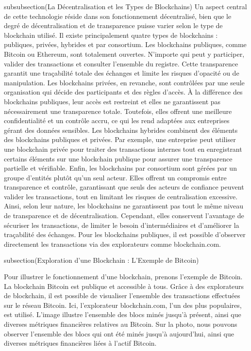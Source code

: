 subsubsection(La Décentralisation et les Types de Blockchains)
Un aspect central de cette technologie réside dans son fonctionnement décentralisé, bien que le degré de décentralisation et de transparence puisse varier selon le type de blockchain utilisé. Il existe principalement quatre types de blockchains : publiques, privées, hybrides et par consortium.
Les blockchains publiques, comme Bitcoin ou Ethereum, sont totalement ouvertes. N’importe qui peut y participer, valider des transactions et consulter l’ensemble du registre. Cette transparence garantit une traçabilité totale des échanges et limite les risques d’opacité ou de manipulation.
Les blockchains privées, en revanche, sont contrôlées par une seule organisation qui décide des participants et des règles d’accès. À la différence des blockchains publiques, leur accès est restreint et elles ne garantissent pas nécessairement une transparence totale. Toutefois, elles offrent une meilleure confidentialité et un contrôle accru, ce qui les rend adaptées aux entreprises gérant des données sensibles.
Les blockchains hybrides combinent des éléments des blockchains publiques et privées. Par exemple, une entreprise peut utiliser une blockchain privée pour traiter des transactions internes tout en enregistrant certains éléments sur une blockchain publique pour assurer une transparence partielle et vérifiable.
Enfin, les blockchains par consortium sont gérées par un groupe d’entités plutôt qu’un seul acteur. Elles offrent un compromis entre transparence et contrôle, garantissant que seuls des acteurs de confiance peuvent valider les transactions, tout en limitant les risques de centralisation excessive.
Ainsi, selon leur nature, les blockchains ne garantissent pas tout le même niveau de transparence et de décentralisation. Cependant, elles conservent l’avantage de sécuriser les transactions, de limiter le besoin d’intermédiaires et d’améliorer la traçabilité des échanges. Pour les blockchains publiques, il est possible d’observer directement les transactions via des explorateurs comme blockchain.com.


subsection(Exploration d'une Blockchain : L'Exemple de Bitcoin)

Pour illustrer le fonctionnement d’une blockchain, prenons l’exemple de Bitcoin. La blockchain Bitcoin est publique et accessible à tous. Grâce à des explorateurs de blockchain, il est possible de visualiser l’ensemble des transactions effectuées sur le réseau Bitcoin. 
Ici, l'explorateur blockchain.com, l'un des plus populaires, est utilisé. L'image illustre l'ensemble des blocs minés jusqu'à présent, ainsi que diverses métriques financières relatives au Bitcoin. Sur la photo, nous pouvons observer l'ensemble des blocs qui ont été minés jusqu'à aujourd'hui, ainsi que diverses métriques financières liées à l'actif Bitcoin.

